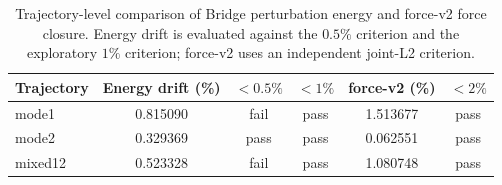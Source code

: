 \begin{table}[htbp]
\centering
\caption{Trajectory-level comparison of Bridge perturbation energy and force-v2 force closure. Energy drift is evaluated against the \(0.5\%\) criterion and the exploratory \(1\%\) criterion; force-v2 uses an independent joint-L2 criterion.}
\label{tab:bridge-gate-summary}
\scriptsize
\setlength{\tabcolsep}{4pt}
\begin{tabular}{@{}lccccc@{}}
\toprule
Trajectory & Energy drift (\%) & \(<0.5\%\) & \(<1\%\) & force-v2 (\%) & \(<2\%\) \\
\midrule
mode1  & 0.815090 & fail & pass & 1.513677 & pass \\
mode2  & 0.329369 & pass & pass & 0.062551 & pass \\
mixed12 & 0.523328 & fail & pass & 1.080748 & pass \\
\bottomrule
\end{tabular}
\end{table}
